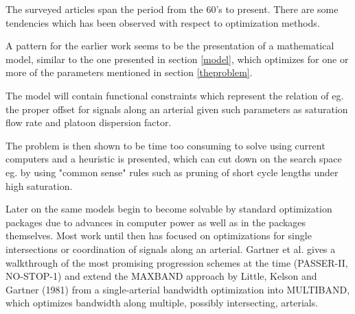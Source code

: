 The surveyed articles span the period from the 60's to present. There are some tendencies which has been observed with respect to optimization methods.

A pattern for the earlier work seems to be the presentation of a mathematical model, similar to the one presented in section \ref{model}, which optimizes for one or more of the parameters mentioned in section \ref{theproblem}. 

The model will contain functional constraints which represent the relation of eg. the proper offset for signals along an arterial given such parameters as saturation flow rate and platoon dispersion factor.

The problem is then shown to be time too consuming to solve using current computers and a heuristic is presented, which can cut down on the search space eg. by using "common sense" rules such as pruning of short cycle lengths under high saturation.

Later on the same models begin to become solvable by standard optimization packages due to advances in computer power as well as in the packages themselves. Most work until then has focused on optimizations for single intersections or coordination of signals along an arterial. Gartner et al. \cite{9} gives a walkthrough of the most promising progression schemes at the time (PASSER-II, NO-STOP-1) and extend the MAXBAND approach by Little, Kelson and Gartner (1981) from a single-arterial bandwidth optimization into MULTIBAND, which optimizes bandwidth along multiple, possibly intersecting, arterials. 


